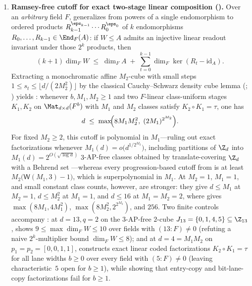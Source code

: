 \begin{enumerate}[label=\arabic*.]
\item \textbf{Ramsey-free cutoff for exact two-stage linear composition ().}
  Over an \emph{arbitrary} field $F$,  generalizes
  \cite[Lemma~6.1]{SharedDecoders2026} from powers of a single endomorphism to ordered products
  $R_{k-1}^{\eps_{k-1}} \cdots R_0^{\eps_0}$ of $k$ endomorphisms $R_0, \dots, R_{k-1} \in \End_F(A)$:
  if $W \le A$ admits an injective linear readout invariant under those $2^k$ products, then
  \[
    (k + 1)\dim_F W \;\le\; \dim_F A \;+\; \sum_{t=0}^{k-1} \dim_F\ker(R_t - \mathrm{id}_A).
  \]
  Extracting a monochromatic affine $M_2$-cube with small steps $1 \le s_t \le \lfloor d/(2M_2^2)\rfloor$
  by the classical Cauchy--Schwarz density cube lemma (;
  \cite{Szemeredi1969,GRS1990}) yields : whenever $b, M_1, M_2 \ge 1$ and two $F$-linear
  class-uniform stages $K_1, K_2$ on $\Mat_{d\times d}(F^b)$ with $M_1$ and $M_2$ classes satisfy
  $K_2 \circ K_1 = \tau$, one has
  \[
    d \;\le\; \max\!\Bigl(8 M_1 M_2^2,\; (2 M_1)^{2^{M_2}}\Bigr).
  \]
  For fixed $M_2 \ge 2$, this cutoff is polynomial in $M_1$---ruling out exact factorizations whenever
  $M_1(d) = o\bigl(d^{1/2^{M_2}}\bigr)$, including partitions of $\Z_d$ into
  $M_1(d) = 2^{O(\sqrt{\log d})}$ $3$-AP-free classes obtained by translate-covering $\Z_d$ with a
  Behrend set \cite{Behrend1946}---whereas every progression-based cutoff from
  \cite[Theorem~6.3]{SharedDecoders2026} is at least $M_2\bigl(\mathsf{W}(M_1, 3) - 1\bigr)$, which is
  superpolynomial in $M_1$. At $M_2 = 1$, $M_1 = 1$, and small constant class counts, however,
  \cite[Theorem~6.3 and Corollary~6.4]{SharedDecoders2026} are stronger: they give $d \le M_1$ at
  $M_2 = 1$, $d \le M_2^2$ at $M_1 = 1$, and $d \le 16$ at $M_1 = M_2 = 2$, where  gives
  $\max(8M_1, 4M_1^2)$, $\max(8M_2^2, 2^{2^{M_2}})$, and $256$. Two finite controls accompany
  : at $d = 13, q = 2$ on the $3$-AP-free $2$-cube $J_{13} = \{0,1,4,5\} \subseteq
  \Z_{13}$,  shows $9 \le \max\dim_F W \le 10$ over fields with
  $(13 : F) \ne 0$ (refuting a naive $2^k$-multiplier bound $\dim_F W \le 8$); and at $d = 4 = M_1 M_2$
  on $p_1 = p_2 = [0,0,1,1]$,  constructs exact linear coded factorizations
  $K_2 \circ K_1 = \tau$ for all lane widths $b \ge 0$ over every field with $(5 : F) \ne 0$ (leaving
  characteristic~$5$ open for $b \ge 1$), while showing that entry-copy and bit-lane-copy
  factorizations fail for $b \ge 1$.


\end{enumerate}
